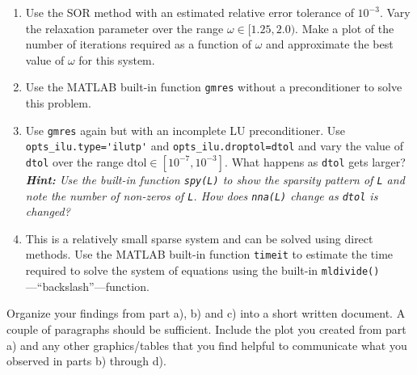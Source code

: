\begin{fullwidth}
\begin{enumerate}
\begin{enumerate}
\item Use the SOR method with an estimated relative error tolerance of $10^{-3}$.  Vary the relaxation parameter over the range $\omega \in [1.25,2.0)$.  Make a plot of the number of iterations required as a function of $\omega$ and approximate the best value of $\omega$ for this system.

\item Use the MATLAB built-in function \lstinline[style=myMatlab]{gmres} without a preconditioner to solve this problem.  

\item Use \lstinline[style=myMatlab]{gmres} again but with an incomplete LU preconditioner.  Use \lstinline[style=myMatlab]{opts_ilu.type='ilutp'} and \lstinline[style=myMatlab]{opts_ilu.droptol=dtol} and vary the value of \lstinline[style=myMatlab]{dtol} over the range $\text{dtol} \in [10^{-7},10^{-3}]$.  What happens as \lstinline[style=myMatlab]{dtol} gets larger? \emph{\textbf{Hint:} Use the built-in function \lstinline[style=myMatlab]{spy(L)} to show the sparsity pattern of \lstinline[style=myMatlab]{L} and note the number of non-zeros of \lstinline[style=myMatlab]{L}.  How does \lstinline[style=myMatlab]{nna(L)} change as \lstinline[style=myMatlab]{dtol} is changed?}

\item This is a relatively small sparse system and can be solved using direct methods.  Use the MATLAB built-in function \lstinline[style=myMatlab]{timeit} to estimate the time required to solve the system of equations using the built-in \lstinline[style=myMatlab]{mldivide()}---``backslash''---function.
\end{enumerate}
Organize your findings from part a), b) and c) into a short written document.  A couple of paragraphs should be sufficient.  Include the plot you created from part a) and any other graphics/tables that you find helpful to communicate what you observed in parts b) through d).

\end{enumerate}

\end{fullwidth}
